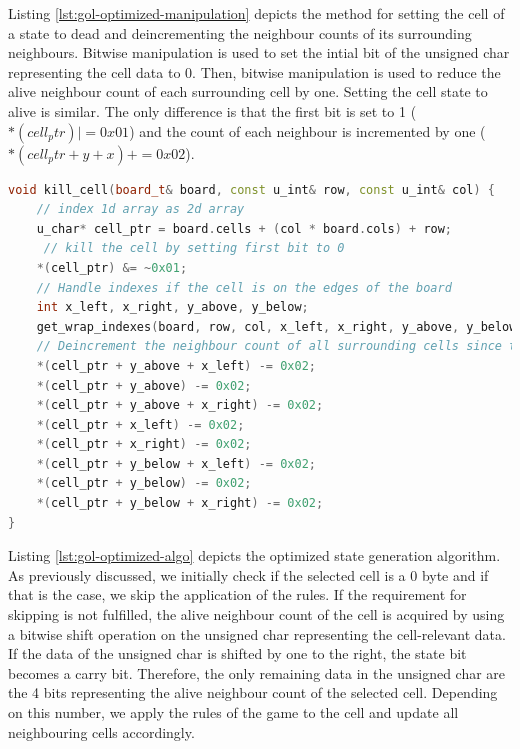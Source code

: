 \documentclass[a4paper,english,12pt,twoside=false]{scrartcl} %
\begin{document}
Listing \ref{lst:gol-optimized-manipulation} depicts the method for setting the cell of a state to dead and deincrementing the neighbour counts of its surrounding neighbours. Bitwise manipulation is used to set the intial bit of the unsigned char representing the cell data to 0. Then, bitwise manipulation is used to reduce the alive neighbour count of each surrounding cell by one. Setting the cell state to alive is similar. The only difference is that the first bit is set to 1 ($*(cell_ptr) |= 0x01$)  and the count of each neighbour is incremented by one ($*(cell_ptr + y + x) += 0x02$).

\begin{lstlisting}[caption={Parallel Naive State Generation Algorithm},label={lst:gol-optimized-manipulation},language=C++]
void kill_cell(board_t& board, const u_int& row, const u_int& col) {
    // index 1d array as 2d array
    u_char* cell_ptr = board.cells + (col * board.cols) + row;
     // kill the cell by setting first bit to 0
    *(cell_ptr) &= ~0x01;
    // Handle indexes if the cell is on the edges of the board
    int x_left, x_right, y_above, y_below;
    get_wrap_indexes(board, row, col, x_left, x_right, y_above, y_below);
    // Deincrement the neighbour count of all surrounding cells since the cell died
    *(cell_ptr + y_above + x_left) -= 0x02;
    *(cell_ptr + y_above) -= 0x02;
    *(cell_ptr + y_above + x_right) -= 0x02;
    *(cell_ptr + x_left) -= 0x02;
    *(cell_ptr + x_right) -= 0x02;
    *(cell_ptr + y_below + x_left) -= 0x02;
    *(cell_ptr + y_below) -= 0x02;
    *(cell_ptr + y_below + x_right) -= 0x02;
}
\end{lstlisting}

Listing \ref{lst:gol-optimized-algo} depicts the optimized state generation algorithm. As previously discussed, we initially check if the selected cell is a 0 byte and if that is the case, we skip the application of the rules. If the requirement for skipping is not fulfilled, the alive neighbour count of the cell is acquired by using a bitwise shift operation on the unsigned char representing the cell-relevant data. If the data of the unsigned char is shifted by one to the right, the state bit becomes a carry bit. Therefore, the only remaining data in the unsigned char are the 4 bits representing the alive neighbour count of the selected cell. Depending on this number, we apply the rules of the game to the cell and update all neighbouring cells accordingly.

\pagebreak
\end{document}
